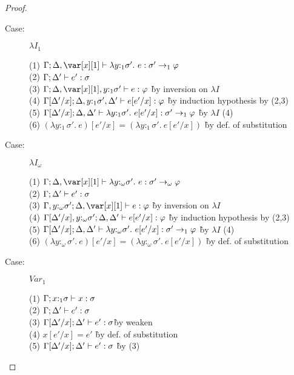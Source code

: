 \begin{proof}
\begin{description}
\item[Case:] $\lambda I_1$
\begin{tabbing}
  (1) $\G; \D, \xl \vdash \lambda y{:}_1\sigma'.~e : \sigma' \to_1 \varphi$\\
  (2) $\Gamma; \Delta' \vdash e' : \sigma$\\
  (3) $\G; \D, \xl, y{:}_1\sigma' \vdash e : \varphi$ \` by inversion on $\lambda I$\\
  (4) $\Gamma[\Delta'/x]; \Delta, y{:}_1\sigma', \Delta' \vdash e[e'/x] : \varphi$ \` by induction hypothesis by (2,3)\\
  (5) $\Gamma[\Delta'/x]; \Delta,\Delta' \vdash \lambda y{:}_1\sigma'.~e[e'/x] : \sigma' \to_1 \varphi$ \` by $\lambda I$ (4)\\
  (6) $(\lambda y{:}_1\sigma'.~e)[e'/x] = (\lambda y{:}_1\sigma'.~e[e'/x])$ \` by def. of substitution\\
\end{tabbing}

\item[Case:] $\lambda I_\omega$
\begin{tabbing}
  (1) $\G; \D, \xl \vdash \lambda y{:}_\omega\sigma'.~e : \sigma' \to_\omega \varphi$\\
  (2) $\Gamma; \Delta' \vdash e' : \sigma$\\
  (3) $\G, y{:}_\omega\sigma'; \D, \xl \vdash e : \varphi$ \` by inversion on $\lambda I$\\
  (4) $\Gamma[\Delta'/x], y{:}_\omega\sigma'; \Delta, \Delta' \vdash e[e'/x] : \varphi$ \` by induction hypothesis by (2,3)\\
  (5) $\Gamma[\Delta'/x]; \Delta,\Delta' \vdash \lambda y{:}_\omega\sigma'.~e[e'/x] : \sigma' \to_1 \varphi$ \` by $\lambda I$ (4)\\
  (6) $(\lambda y{:}_\omega\sigma'.~e)[e'/x] = (\lambda y{:}_\omega\sigma'.~e[e'/x])$ \` by def. of substitution\\
\end{tabbing}

\item[Case:] $Var_1$
\begin{tabbing}
  (1) $\Gamma;x{:}_1\sigma \vdash x : \sigma$\\
  (2) $\Gamma;\Delta' \vdash e' : \sigma$\\
  (3) $\Gamma[\Delta'/x]; \Delta' \vdash e' : \sigma$\` by weaken\\
  (4) $x[e'/x] = e'$ \` by def. of substitution\\
  (5) $\Gamma[\Delta'/x];\Delta' \vdash e' : \sigma$ \` by (3)\\
\end{tabbing}


\end{description}
\end{proof}
